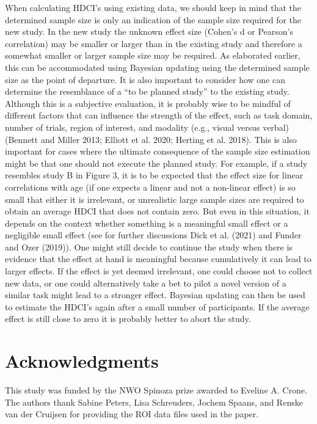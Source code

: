 \documentclass[
  letterpaper,
  DIV=11,
  numbers=noendperiod]{scrartcl}
\begin{document}
When calculating HDCI's using existing data, we should keep in mind that
the determined sample size is only an indication of the sample size
required for the new study. In the new study the unknown effect size
(Cohen's d or Pearson's correlation) may be smaller or larger than in
the existing study and therefore a somewhat smaller or larger sample
size may be required. As elaborated earlier, this can be accommodated
using Bayesian updating using the determined sample size as the point of
departure. It is also important to consider how one can determine the
resemblance of a ``to be planned study'' to the existing study. Although
this is a subjective evaluation, it is probably wise to be mindful of
different factors that can influence the strength of the effect, such as
task domain, number of trials, region of interest, and modality (e.g.,
visual versus verbal) (Bennett and Miller 2013; Elliott et al. 2020;
Herting et al. 2018). This is also important for cases where the
ultimate consequence of the sample size estimation might be that one
should not execute the planned study. For example, if a study resembles
study B in Figure 3, it is to be expected that the effect size for
linear correlations with age (if one expects a linear and not a
non-linear effect) is so small that either it is irrelevant, or
unrealistic large sample sizes are required to obtain an average HDCI
that does not contain zero. But even in this situation, it depends on
the context whether something is a meaningful small effect or a
negligible small effect (see for further discussions Dick et al. (2021)
and Funder and Ozer (2019)). One might still decide to continue the
study when there is evidence that the effect at hand is meaningful
because cumulatively it can lead to larger effects. If the effect is yet
deemed irrelevant, one could choose not to collect new data, or one
could alternatively take a bet to pilot a novel version of a similar
task might lead to a stronger effect. Bayesian updating can then be used
to estimate the HDCI's again after a small number of participants. If
the average effect is still close to zero it is probably better to abort
the study.

\section{Acknowledgments}\label{acknowledgments}

This study was funded by the NWO Spinoza prize awarded to Eveline A.
Crone. The authors thank Sabine Peters, Lisa Schreuders, Jochem Spaans,
and Renske van der Cruijsen for providing the ROI data files used in the
paper.
\end{document}
